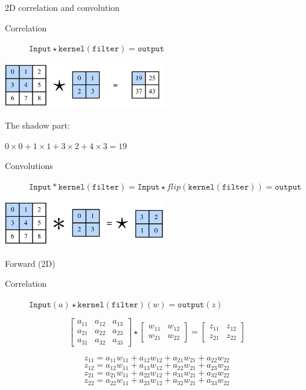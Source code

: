 \documentclass[aspectratio=1610,xcolor={dvipsnames},hyperref={colorlinks,unicode,linkcolor=violet,anchorcolor=BlueViolet,citecolor=YellowOrange,filecolor=black,urlcolor=Aquamarine}]{beamer}
\begin{document}
\begin{frame}[label={sec:org87c1d82}]{2D correlation and convolution}
\begin{description}
\item[{Correlation}] \(\mathtt {Input} \star \mathtt {kernel (filter)} = \mathtt {output}\)
\end{description}

\begin{center}
\includegraphics[height=2cm]{./p3.png}
\end{center}

The shadow part:

\(0 \times 0 + 1 \times 1 + 3 \times 2 + 4 \times 3 = 19\)

\begin{description}
\item[{Convolutions}] \(\mathtt {Input} * \mathtt {kernel (filter)} = \mathtt {Input} \star flip(\mathtt {kernel (filter)}) = \mathtt {output}\)
\end{description}

\begin{center}
\includegraphics[height=2cm]{./p4.png}
\end{center}
\end{frame}

\begin{frame}[label={sec:org7d515fb}]{Forward (2D)}
\begin{description}
\item[{Correlation}] \(\mathtt {Input}(a) \star \mathtt {kernel (filter)}(w) = \mathtt {output}(z)\)
\end{description}

\begin{equation}
\begin{bmatrix}
a_{11}&a_{12}&a_{13} \\
a_{21}&a_{22}&a_{23}\\
a_{31}&a_{32}&a_{33}
\end{bmatrix} \star
\begin{bmatrix}
w_{11}&w_{12}\\
w_{21}&w_{22}
\end{bmatrix} =
\begin{bmatrix}
z_{11}&z_{12}\\
z_{21}&z_{22}
\end{bmatrix}
\end{equation}

\[z_{11} = a_{11}w_{11} + a_{12}w_{12} + a_{21}w_{21} +   a_{22}w_{22}\]
\[z_{12} = a_{12}w_{11} + a_{13}w_{12} + a_{22}w_{21} +   a_{23}w_{22}\]
\[z_{21} = a_{21}w_{11} + a_{22}w_{12} + a_{31}w_{21} +   a_{32}w_{22}\]
\[z_{22} = a_{22}w_{11} + a_{23}w_{12} + a_{32}w_{21} +   a_{33}w_{22}\]
\end{frame}
\end{document}
